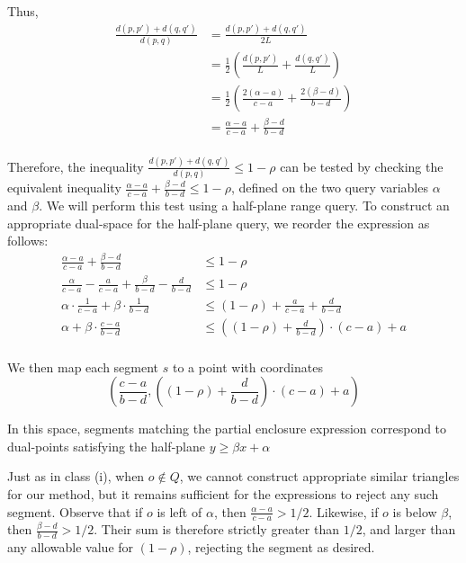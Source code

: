 \noindent Thus,
\[
\begin{split} 
\frac{d(p, p') + d(q, q')}{d(p, q)}
%
&= \frac{d(p, p') + d(q, q')}{2L} \\
%
&= \frac{1}{2} \left ( \frac{d(p, p')}{L} + \frac{d(q, q')}{L} \right ) \\
%
&= \frac{1}{2} \left ( \frac{2(\alpha - a)}{c - a} + \frac{2(\beta - d)}{b - d} \right ) \\
%
&= \frac{\alpha - a}{c - a} + \frac{\beta - d}{b - d} \\
%
\end{split}
\]

\indent Therefore, the inequality $\frac{d(p, p') + d(q, q')}{d(p, q)} \leq 1 - \rho$ can be tested by checking the equivalent inequality $\frac{\alpha - a}{c - a} + \frac{\beta - d}{b - d} \leq 1 - \rho$, defined on the two query variables $\alpha$ and $\beta$. 
We will perform this test using a half-plane range query. 
To construct an appropriate dual-space for the half-plane query, we reorder the expression as follows:
\[
\begin{split}
\frac{\alpha - a}{c - a} + \frac{\beta - d}{b - d} &\leq 1 - \rho \\
%
\frac{\alpha}{c-a} - \frac{a}{c-a} + \frac{\beta}{b-d} - \frac{d}{b-d} &\leq 1 - \rho \\
%
\alpha \cdot \frac{1}{c-a} + \beta \cdot \frac{1}{b-d} &\leq (1 - \rho) + \frac{a}{c-a} + \frac{d}{b-d} \\
%
\alpha + \beta \cdot \frac{c-a}{b-d} &\leq \left ( (1 - \rho) + \frac{d}{b-d} \right ) \cdot (c-a) + a \\
%
\end{split}
\]

\noindent We then map each segment $s$ to a point with coordinates
\[
\left (\frac{c-a}{b-d}, \left ( (1 - \rho) + \frac{d}{b-d} \right ) \cdot (c-a) + a \right )
\]

\noindent In this space, segments matching the partial enclosure expression correspond to dual-points satisfying the half-plane $y \geq \beta x + \alpha$

Just as in class (i), when $o \not \in Q$, we cannot construct appropriate similar triangles for our method, but it remains sufficient for the expressions to reject any such segment. Observe that if $o$ is left of $\alpha$, then $\frac{\alpha - a}{c - a} > 1/2$. Likewise, if $o$ is below $\beta$, then $\frac{\beta - d}{b - d} > 1/2$. Their sum is therefore strictly greater than $1/2$, and larger than any allowable value for $(1 - \rho)$, rejecting the segment as desired.


